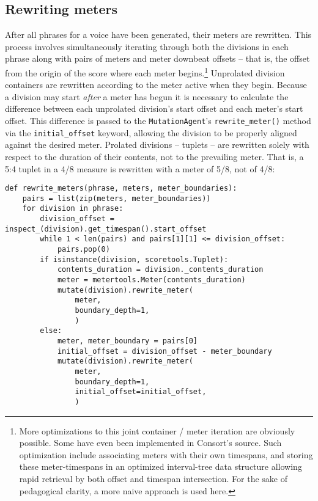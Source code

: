 \subsection{Rewriting meters}
\label{ssec:rewriting-meters}

After all phrases for a voice have been generated, their meters are rewritten.
This process involves simultaneously iterating through both the divisions in
each phrase along with pairs of meters and meter downbeat offsets -- that is,
the offset from the origin of the score where each meter begins.\footnote{More
optimizations to this joint container / meter iteration are obviously possible.
Some have even been implemented in Consort's source. Such optimization include
associating meters with their own timespans, and storing these meter-timespans
in an optimized interval-tree data structure allowing rapid retrieval by both
offset and timespan intersection. For the sake of pedagogical clarity, a more
naive approach is used here.} Unprolated division containers are rewritten
according to the meter active when they begin. Because a division may start
\emph{after} a meter has begun it is necessary to calculate the difference
between each unprolated division's start offset and each meter's start offset.
This difference is passed to the \texttt{MutationAgent}'s
\texttt{rewrite\_meter()} method via the \texttt{initial\_offset} keyword,
allowing the division to be properly aligned against the desired meter.
Prolated divisions -- tuplets -- are rewritten solely with respect to the
duration of their contents, not to the prevailing meter. That is, a 5:4 tuplet
in a 4/8 measure is rewritten with a meter of 5/8, not of 4/8:

\begin{comment}
<abjadextract dissertation.py.time_tools:rewrite_meters />[strip_prompt]
\end{comment}

\begin{abjadbookoutput}
\begin{singlespacing}
\vspace{-0.5\baselineskip}
\begin{lstlisting}
def rewrite_meters(phrase, meters, meter_boundaries):
    pairs = list(zip(meters, meter_boundaries))
    for division in phrase:
        division_offset = inspect_(division).get_timespan().start_offset
        while 1 < len(pairs) and pairs[1][1] <= division_offset:
            pairs.pop(0)
        if isinstance(division, scoretools.Tuplet):
            contents_duration = division._contents_duration
            meter = metertools.Meter(contents_duration)
            mutate(division).rewrite_meter(
                meter,
                boundary_depth=1,
                )
        else:
            meter, meter_boundary = pairs[0]
            initial_offset = division_offset - meter_boundary
            mutate(division).rewrite_meter(
                meter,
                boundary_depth=1,
                initial_offset=initial_offset,
                )
\end{lstlisting}
\end{singlespacing}
\end{abjadbookoutput}

